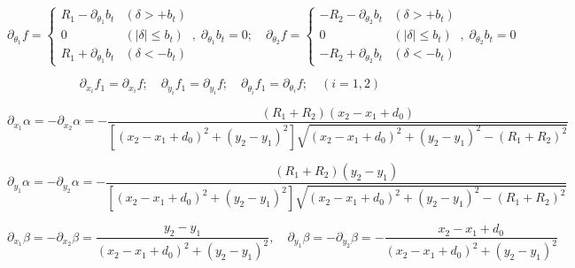 \begin{equation}
	\partial_{\theta_1}f = \begin{cases} 
		R_1 - \partial_{\theta_1}b_t & (\delta > +b_t) \\
		0 & (|\delta| \le b_t) \\
		R_1 + \partial_{\theta_1}b_t & (\delta < -b_t)
	\end{cases} , \; \partial_{\theta_1}b_t = 0; \quad 
	\partial_{\theta_2}f = \begin{cases} 
		-R_2 - \partial_{\theta_2}b_t & (\delta > +b_t) \\
		0 & (|\delta| \le b_t) \\
		-R_2 + \partial_{\theta_2}b_t & (\delta < -b_t)
	\end{cases} , \; \partial_{\theta_2}b_t = 0
	\label{eq:f_theta}
\end{equation}

\begin{equation}
	\partial_{\dot{x}_i}f_1 = \partial_{x_i}f; \quad \partial_{\dot{y}_i}f_1 = \partial_{y_i}f; \quad \partial_{\dot{\theta}_i}f_1 = \partial_{\theta_i}f; \quad (i = 1, 2)
	\label{eq:f1_derivadas}
\end{equation}

\begin{equation}
	\partial_{x_1}\alpha = -\partial_{x_2}\alpha = -\frac{(R_1 + R_2)(x_2 - x_1 + d_0)}{\left[ (x_2 - x_1 + d_0)^2 + (y_2 - y_1)^2 \right] \sqrt{(x_2 - x_1 + d_0)^2 + (y_2 - y_1)^2 - (R_1 + R_2)^2}}
	\label{eq:alpha_x}
\end{equation}

\begin{equation}
	\partial_{y_1}\alpha = -\partial_{y_2}\alpha = -\frac{(R_1 + R_2)(y_2 - y_1)}{\left[ (x_2 - x_1 + d_0)^2 + (y_2 - y_1)^2 \right] \sqrt{(x_2 - x_1 + d_0)^2 + (y_2 - y_1)^2 - (R_1 + R_2)^2}}
	\label{eq:alpha_y}
\end{equation}

\begin{equation}
	\partial_{x_1}\beta = -\partial_{x_2}\beta = \frac{y_2 - y_1}{(x_2 - x_1 + d_0)^2 + (y_2 - y_1)^2}, \quad \partial_{y_1}\beta = -\partial_{y_2}\beta = -\frac{x_2 - x_1 + d_0}{(x_2 - x_1 + d_0)^2 + (y_2 - y_1)^2}
	\label{eq:beta_xy}
\end{equation}

